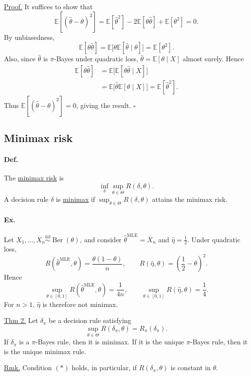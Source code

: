 \documentclass[11pt,a4paper]{article}
\begin{document}
\medskip
\noindent\underline{Proof.}\quad
It suffices to show that
\[
\mathbb E[(\hat\theta-\theta)^2]
=\mathbb E[\hat\theta^2]-2\mathbb E[\theta\hat\theta]
+\mathbb E[\theta^2]=0.
\]
By unbiasedness,
\[
\mathbb E[\theta\hat\theta]
=\mathbb E\bigl[\theta\mathbb E[\hat\theta\mid\theta]\bigr]
=\mathbb E[\theta^2].
\]
Also, since $\hat\theta$ is $\pi$-Bayes under quadratic loss,
$\hat\theta=\mathbb E[\theta\mid X]$ almost surely. Hence
\[
\begin{aligned}
\mathbb E[\theta\hat\theta]
&=\mathbb E\bigl[\mathbb E[\theta\hat\theta\mid X]\bigr]\\
&=\mathbb E\bigl[\hat\theta\mathbb E[\theta\mid X]\bigr]
=\mathbb E[\hat\theta^2].
\end{aligned}
\]
Thus $\mathbb E[(\hat\theta-\theta)^2]=0$, giving the result.
\hfill$\square$

\subsection*{Minimax risk}

\paragraph{Def.}
The \underline{minimax risk} is
\[
\inf_\delta\sup_{\theta\in\Theta}R(\delta,\theta).
\]
A decision rule $\delta$ is \underline{minimax} if
$\sup_{\theta\in\Theta}R(\delta,\theta)$ attains the minimax risk.

\paragraph{Ex.}
Let $X_1,\ldots,X_n\overset{\mathrm{iid}}\sim\operatorname{Ber}(\theta)$,
and consider $\hat\theta^{\mathrm{MLE}}=\overline X_n$ and
$\hat\eta=\frac12$. Under quadratic loss,
\[
R(\hat\theta^{\mathrm{MLE}},\theta)=\frac{\theta(1-\theta)}n,
\qquad R(\hat\eta,\theta)=\left(\frac12-\theta\right)^2.
\]
Hence
\[
\sup_{\theta\in[0,1]}R(\hat\theta^{\mathrm{MLE}},\theta)=\frac1{4n},
\qquad
\sup_{\theta\in[0,1]}R(\hat\eta,\theta)=\frac14.
\]
For $n>1$, $\hat\eta$ is therefore not minimax.

\medskip
\noindent\underline{Thm 2.}\quad
Let $\delta_\pi$ be a decision rule satisfying
\[
\sup_{\theta\in\Theta}R(\delta_\pi,\theta)=R_\pi(\delta_\pi).
\tag{$*$}
\]
If $\delta_\pi$ is a $\pi$-Bayes rule, then it is minimax.
If it is the unique $\pi$-Bayes rule, then it is the unique minimax rule.

\medskip
\noindent\underline{Rmk.}\quad
Condition $(*)$ holds, in particular, if $R(\delta_\pi,\theta)$ is
constant in $\theta$.
\end{document}
